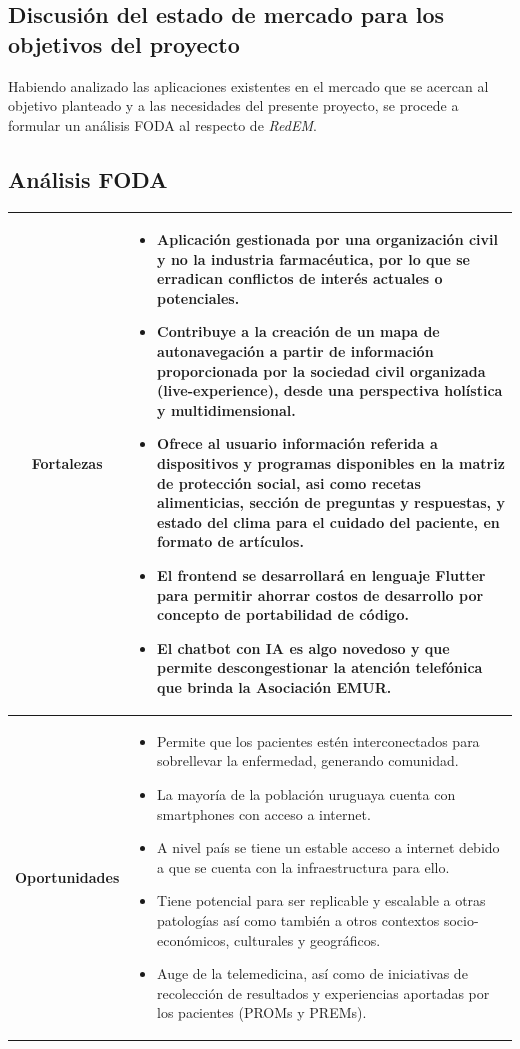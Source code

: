 \subsection{Discusión del estado de mercado para los objetivos del proyecto}
Habiendo analizado las aplicaciones existentes en el mercado que se acercan al objetivo planteado y a las necesidades del presente proyecto, se procede a formular un análisis FODA al respecto de \emph{RedEM}.

\subsection{Análisis FODA}

\begin{tabular}{|c|l|}
\hline
\textbf{Fortalezas} & \parbox{10cm}{
\begin{itemize}
    \item Aplicación gestionada por una organización civil y no la industria farmacéutica, por lo que se erradican conflictos de interés actuales o potenciales.
    \item Contribuye a la creación de un mapa de autonavegación a partir de información proporcionada por la sociedad civil organizada (live-experience), desde una perspectiva holística y multidimensional.
    \item Ofrece al usuario información referida a dispositivos y programas disponibles en la matriz de protección social, asi como recetas alimenticias, sección de preguntas y respuestas, y estado del clima para el cuidado del paciente, en formato de artículos.
    \item El frontend se desarrollará en lenguaje Flutter para permitir ahorrar costos de desarrollo por concepto de portabilidad de código.
    \item El chatbot con IA es algo novedoso y que permite descongestionar la atención telefónica que brinda la Asociación EMUR.
\end{itemize}
} \\
\hline
\textbf{Oportunidades} & \parbox{10cm}{
\begin{itemize}
    \item Permite que los pacientes estén interconectados para sobrellevar la enfermedad, generando comunidad.
    \item La mayoría de la población uruguaya cuenta con smartphones con acceso a internet.
    \item A nivel país se tiene un estable acceso a internet debido a que se cuenta con la infraestructura para ello. 
    \item Tiene potencial para ser replicable y escalable a otras patologías así como también a otros contextos socio-económicos, culturales y geográficos.
    \item Auge de la telemedicina, así como de iniciativas de recolección de resultados y experiencias aportadas por los pacientes (PROMs y PREMs).
\end{itemize}
} \\
\hline
\end{tabular}

